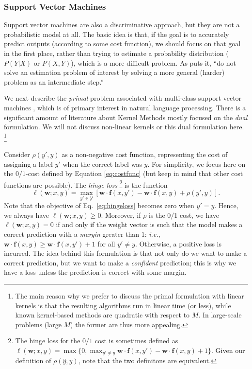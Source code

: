 \subsubsection{Support Vector Machines}\label{sec:svms}

Support vector machines are also a discriminative approach, but they are not a probabilistic model at all. 
The basic idea is that, if the goal is to accurately predict outputs (according to some cost function), we should focus on that 
goal in the first place, rather than trying to estimate a probability distribution ($P(Y|X)$ or $P(X,Y)$), 
which is a more difficult problem. As \citet{Vapnik1995} puts it, 
``do not solve an estimation problem of interest by solving a more general (harder) problem as an intermediate step.''  

We next describe the \emph{primal} problem associated with multi-class support vector machines \citep{Crammer2002}, 
which is of primary interest in natural language processing. 
There is a significant amount of literature about Kernel Methods \citep{Schoelkopf2002,ShaweTaylor2004} mostly focused 
on the \emph{dual} formulation. We will not discuss non-linear kernels or this dual formulation here.%
\footnote{The main reason why we prefer to discuss the primal formulation with linear kernels is that 
the resulting algorithms run in linear time (or less), while known kernel-based methods are quadratic with 
respect to $M$. In large-scale problems (large $M$) the former are thus more appealing.}

Consider $\rho(y',y)$ as a non-negative cost function, representing the cost of assigning a label $y'$ when the correct label was $y$. For simplicity, we focus here on the $0/1$-cost defined by Equation \ref{eq:costfunc} (but keep in mind that other cost functions are possible).  
The \emph{hinge loss}%
\footnote{The hinge loss for the $0/1$ cost is sometimes defined as 
$\ell(\boldsymbol{w}; x,y) = \max\{0, \max_{y' \ne y} \boldsymbol{w} \cdot \boldsymbol{f}(x,y') - \boldsymbol{w} \cdot\boldsymbol{f}(x,y) + 1\}$.
Given our definition of $\rho(\hat{y},y)$, note that the  two definitons are equivalent.} %
 is the function
\begin{equation}\label{eq:hingeloss}
\ell(\boldsymbol{w}; x,y) = \max_{y' \in \mathcal{Y}} \left[\boldsymbol{w} \cdot \boldsymbol{f}(x,y') - \boldsymbol{w} \cdot\boldsymbol{f}(x,y) + \rho(y',y)\right].
\end{equation}
Note that the objective of Eq.~\ref{eq:hingeloss} becomes zero when $y'=y$. Hence, we always have $\ell(\boldsymbol{w}; x,y)\ge 0$. 
Moreover, if $\rho$ is the $0/1$ cost, we have $\ell(\boldsymbol{w}; x,y)= 0$ if and only if the weight vector is such that the model makes a correct prediction 
with a \emph{margin} greater than $1$: \emph{i.e.}, $\boldsymbol{w} \cdot \boldsymbol{f}(x,y) \ge \boldsymbol{w} \cdot\boldsymbol{f}(x,y') + 1$ for all $y' \ne y$. 
Otherwise, a positive loss is incurred. The idea behind this formulation is that not only do we want to make a correct prediction, but we want to make a \emph{confident} prediction; this is why we have a loss unless the prediction is correct with some margin.

